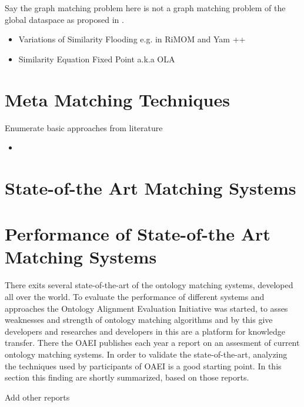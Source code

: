 \documentclass[11pt,titlepage,oneside,openany,a4paper]{report}
\begin{document}
Say the graph matching problem here is not a graph matching problem of the global dataspace as proposed in \cite{JoslynPW08}.	
	
\begin{itemize}
	\item Variations of Similarity Flooding \cite{Melnik:2002} e.g. in RiMOM and Yam ++
	\item Similarity Equation Fixed Point a.k.a OLA  \cite{EuzenatV04}
\end{itemize}


\section{Meta Matching Techniques}
Enumerate basic approaches from literature

\begin{itemize}
\item 
\end{itemize}
\section{State-of-the Art Matching Systems}

\section{Performance of State-of-the Art Matching Systems}
\label{sec:state_of_the_art}
There exits several state-of-the-art of the ontology matching systems, developed all over the world. To evaluate the performance of different systems and approaches the Ontology Alignment Evaluation Initiative was started, to asses weaknesses and strength of ontology matching algorithms and by this give developers and researches and developers in this are a platform for knowledge transfer. \cite{Euzenat:2011aa} 
There the OAEI publishes each year a report on an assesment of current ontology matching systems. In order to validate the state-of-the-art, analyzing the techniques used by participants of OAEI is a good starting point. In this section this finding are shortly summarized, based on those reports. \cite{EuzenatOAEI11} \cite{AguirreOAEI12} \cite{GrauOAEI13}  \cite{euzenat2014}
\begin{Huge}
Add other reports
\end{Huge}
\end{document}
